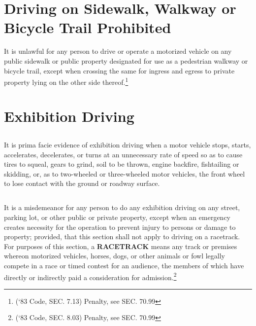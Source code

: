\section{Driving on Sidewalk, Walkway or Bicycle Trail Prohibited}
It is unlawful for any person to drive or operate a motorized vehicle on any public sidewalk or public property designated for use as a pedestrian walkway or bicycle trail, except when crossing the same for ingress and egress to private property lying on the other side thereof.\footnote{(‘83 Code, SEC. 7.13) Penalty, see SEC. 70.99}

\section{Exhibition Driving}
\subsection{}
It is prima facie evidence of exhibition driving when a motor vehicle stops, starts, accelerates, decelerates, or turns at an unnecessary rate of speed so as to cause tires to squeal, gears to grind, soil to be thrown, engine backfire, fishtailing or skidding, or, as to two-wheeled or three-wheeled motor vehicles, the front wheel to lose contact with the ground or roadway surface.
\subsection{}
It is a misdemeanor for any person to do any exhibition driving on any street, parking lot, or other public or private property, except when an emergency creates necessity for the operation to prevent injury to persons or damage to property; provided, that this section shall not apply to driving on a racetrack.  For purposes of this section, a \textbf{RACETRACK} means any track or premises whereon motorized vehicles, horses, dogs, or other animals or fowl legally compete in a race or timed contest for an audience, the members of which have directly or indirectly paid a consideration for admission.\footnote{(‘83 Code, SEC. 8.03) Penalty, see SEC. 70.99}\\


\setcounter{section}{14}
